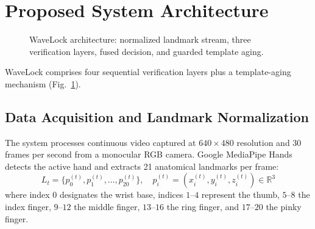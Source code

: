 \documentclass[conference]{IEEEtran}
\begin{document}
\section{Proposed System Architecture}
\label{sec:architecture}

\begin{figure}[t]
\centering
{}
\caption{WaveLock architecture: normalized landmark stream, three verification layers, fused decision, and guarded template aging.}
\label{fig:pipeline_overview}
\end{figure}

WaveLock comprises four sequential verification layers plus a template-aging mechanism (Fig.~\ref{fig:pipeline_overview}).



\subsection{Data Acquisition and Landmark Normalization}

The system processes continuous video captured at $640 \times 480$ resolution and 30 frames per second from a monocular RGB camera. Google MediaPipe Hands~\cite{mediapipe} detects the active hand and extracts 21 anatomical landmarks per frame:
\begin{equation}
L_t = \{p_0^{(t)}, p_1^{(t)}, \ldots, p_{20}^{(t)}\}, \quad p_i^{(t)} = (x_i^{(t)}, y_i^{(t)}, z_i^{(t)}) \in \mathbb{R}^3
\end{equation}
where index $0$ designates the wrist base, indices $1\text{--}4$ represent the thumb, $5\text{--}8$ the index finger, $9\text{--}12$ the middle finger, $13\text{--}16$ the ring finger, and $17\text{--}20$ the pinky finger.
\end{document}
